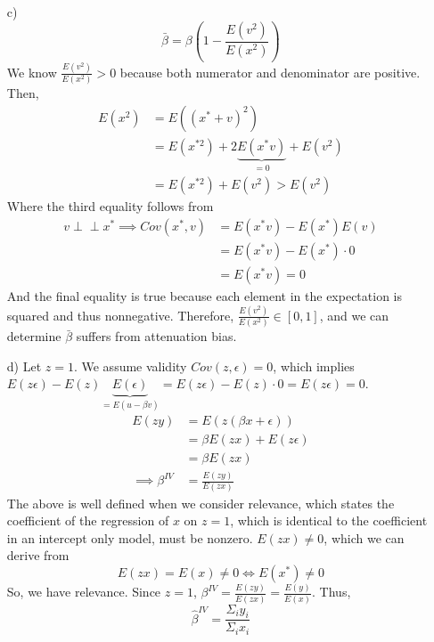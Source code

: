 \documentclass[
]{article}
\begin{document}
\begin{enumerate}
\item[c)] 
\[\bar{\beta} = \beta(1-\frac{E(v^2)}{E(x^2)})\]
We know $\frac{E(v^2)}{E(x^2)} > 0$ because both numerator and denominator are positive. Then,
\[\begin{aligned}
E(x^2) &= E((x^* + v)^2) \\
&= E(x^{*2}) + 2 \underbrace{E(x^*v)}_{=0} + E(v^2) \\
&= E(x^{*2}) + E(v^2) > E(v^2)
\end{aligned}\]
Where the third equality follows from 
\[\begin{aligned}
v \perp \!\!\!\perp x^* \implies Cov(x^*, v) &=E(x^*v) - E(x^*)E(v) \\ 
&= E(x^*v) - E(x^*)\cdot0 \\
&= E(x^*v) = 0
\end{aligned}\]
And the final equality is true because each element in the expectation is squared and thus nonnegative. Therefore, $\frac{E(v^2)}{E(x^2)} \in [0,1]$, and we can determine $\bar{\beta}$ suffers from attenuation bias.  

\item[d)]
Let $z = 1$. We assume validity $Cov(z, \epsilon) = 0$, which implies $E(z \epsilon) - E(z)\underbrace{E(\epsilon)}_{=E(u - \beta v )} = E(z\epsilon) - E(z) \cdot 0 =E(z\epsilon) = 0$. 
\[\begin{aligned}
E(zy) &= E(z(\beta x + \epsilon)) \\
&= \beta E(zx) + E(z\epsilon) \\
&= \beta E(zx)\\
\implies \beta^{IV} &= \frac{E(zy)}{E(zx)}
\end{aligned}\]
The above is well defined when we consider relevance, which states the coefficient of the regression of $x$ on $z=1$, which is identical to the coefficient in an intercept only model, must be nonzero. $E(zx) \ne 0$, which we can derive from 
\[E(zx) = E(x) \ne 0 \iff E(x^*) \ne 0\] 
So, we have relevance.
Since $z = 1$, $\beta^{IV} = \frac{E(zy)}{E(zx)} = \frac{E(y)}{E(x)}$. 
Thus, 
\[\hat\beta ^{IV} = \frac{\Sigma_i y_i}{\Sigma_i x_i}\]


\end{enumerate}
\end{document}
